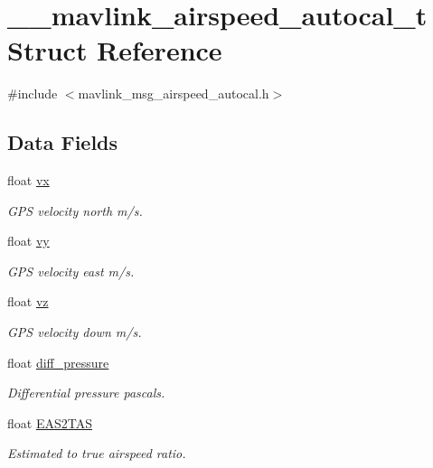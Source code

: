 \hypertarget{struct____mavlink__airspeed__autocal__t}{\section{\+\_\+\+\_\+mavlink\+\_\+airspeed\+\_\+autocal\+\_\+t Struct Reference}
\label{struct____mavlink__airspeed__autocal__t}
}


{\ttfamily \#include $<$mavlink\+\_\+msg\+\_\+airspeed\+\_\+autocal.\+h$>$}

\subsection*{Data Fields}
\begin{DoxyCompactItemize}
\item 
float \hyperlink{struct____mavlink__airspeed__autocal__t_a9488f3313ddf0182b79dc35efcd0b98c}{vx}
\begin{DoxyCompactList}\small\item\em G\+P\+S velocity north m/s. \end{DoxyCompactList}\item 
float \hyperlink{struct____mavlink__airspeed__autocal__t_a5b3f6cf7a18802ea9a2dd3fe502f8ec4}{vy}
\begin{DoxyCompactList}\small\item\em G\+P\+S velocity east m/s. \end{DoxyCompactList}\item 
float \hyperlink{struct____mavlink__airspeed__autocal__t_a9d0d32bc5b09880e3ced7586c2e0da2b}{vz}
\begin{DoxyCompactList}\small\item\em G\+P\+S velocity down m/s. \end{DoxyCompactList}\item 
float \hyperlink{struct____mavlink__airspeed__autocal__t_a1944a4411ee40af06eb77789b5c38555}{diff\+\_\+pressure}
\begin{DoxyCompactList}\small\item\em Differential pressure pascals. \end{DoxyCompactList}\item 
float \hyperlink{struct____mavlink__airspeed__autocal__t_a7342420cf14c60e0dcc928f76cbcb368}{E\+A\+S2\+T\+A\+S}
\begin{DoxyCompactList}\small\item\em Estimated to true airspeed ratio. \end{DoxyCompactList}\item 

\end{DoxyCompactItemize}

